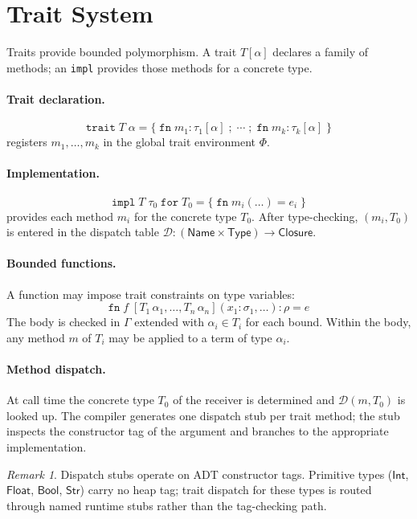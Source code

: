 \documentclass[10pt,a4paper]{article}
\newcommand{\TInt}{\mathsf{Int}}
\newcommand{\TFlt}{\mathsf{Float}}
\newcommand{\TBool}{\mathsf{Bool}}
\newcommand{\TStr}{\mathsf{Str}}
\theoremstyle{plain}
\theoremstyle{definition}
\theoremstyle{remark}
\newtheorem{remark}{Remark}
\begin{document}
\section{Trait System}
\label{sec:traits}

Traits provide bounded polymorphism.  A trait $T[\alpha]$ declares a family
of methods; an \texttt{impl} provides those methods for a concrete type.

\paragraph{Trait declaration.}
\[
\mathtt{trait}\;T\;\alpha = \bigl\{\;\mathtt{fn}\;m_1:\tau_1[\alpha]\;;\;\cdots\;;\;\mathtt{fn}\;m_k:\tau_k[\alpha]\;\bigr\}
\]
registers $m_1,\ldots,m_k$ in the global trait environment $\Phi$.

\paragraph{Implementation.}
\[
\mathtt{impl}\;T\;\tau_0\;\mathtt{for}\;T_0 =
\bigl\{\;\mathtt{fn}\;m_i(\ldots)=e_i\;\bigr\}
\]
provides each method $m_i$ for the concrete type $T_0$.  After
type-checking, $(m_i,T_0)$ is entered in the dispatch table
$\mathcal{D}:(\mathsf{Name}\times\mathsf{Type})\to\mathsf{Closure}$.

\paragraph{Bounded functions.}
A function may impose trait constraints on type variables:
\[
\mathtt{fn}\;f\;[T_1\,\alpha_1,\ldots,T_n\,\alpha_n]
  (x_1:\sigma_1,\ldots):\rho = e
\]
The body is checked in $\Gamma$ extended with $\alpha_i\in T_i$ for each
bound.  Within the body, any method $m$ of $T_i$ may be applied to a
term of type $\alpha_i$.

\paragraph{Method dispatch.}
At call time the concrete type $T_0$ of the receiver is determined and
$\mathcal{D}(m,T_0)$ is looked up.  The compiler generates one dispatch stub
per trait method; the stub inspects the constructor tag of the argument
and branches to the appropriate implementation.

\begin{remark}
Dispatch stubs operate on ADT constructor tags.  Primitive types
($\TInt$, $\TFlt$, $\TBool$, $\TStr$) carry no heap tag; trait dispatch
for these types is routed through named runtime stubs rather than the
tag-checking path.
\end{remark}
\end{document}
